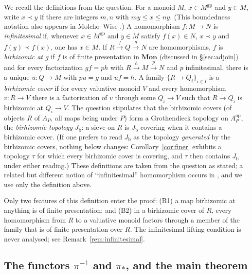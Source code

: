\documentclass[11pt]{article}
\newcommand{\gp}{\mathrm{gp}}
\newcommand{\Jb}{J_{\mathrm b}}
\theoremstyle{definition}
\theoremstyle{remark}
\begin{document}
We recall the definitions from the question.  For a monoid \(M\),
\(x\in M^{\gp}\) and \(y\in M\), write \(x\prec y\) if there are integers
\(m,n\) with \(my\le x\le ny\).  (This boundedness notation also appears in
Molcho--Wise \cite[Def.~2.1.3.1]{MW}.)  A homomorphism \(f:M\to N\) is
\emph{infinitesimal} if, whenever \(x\in M^{\gp}\) and \(y\in M\) satisfy
\(f(x)\in N\), \(x\prec y\) and \(f(y)\prec f(x)\), one has \(x\in M\).
If \(R\xrightarrow{f}Q\xrightarrow{g}N\) are homomorphisms, \(f\) is
\emph{birhizomic at \(g\)} if \(f\) is of finite presentation in
\(\mathbf{Mon}\) (discussed in \S\ref{sec:adjoin}) and for every factorization \(gf=ph\) with
\(R\xrightarrow{h}M\xrightarrow{p}N\) and \(p\) infinitesimal, there is a
unique \(u:Q\to M\) with \(pu=g\) and \(uf=h\).  A family
\(\{R\to Q_i\}_{i\in I}\) is a \emph{birhizomic cover} if for every valuative
monoid \(V\) and every homomorphism \(v:R\to V\) there is a factorization of
\(v\) through some \(Q_i\to V\) such that \(R\to Q_i\) is birhizomic at
\(Q_i\to V\).  The question stipulates that the birhizomic covers (of objects
\(R\) of \(A_P\), all maps being under \(P\)) form a Grothendieck topology on
\(A_P^{\mathrm{op}}\), the \emph{birhizomic topology} \(\Jb\): a sieve on
\(R\) is \(\Jb\)-covering when it contains a birhizomic cover.  (If one
prefers to read \(\Jb\) as the topology \emph{generated} by the birhizomic
covers, nothing below changes: Corollary~\ref{cor:finer} exhibits a
topology \(\tau\) for which every birhizomic cover is covering, and
\(\tau\) then contains \(\Jb\) under either reading.)  These definitions
are taken from the question as stated; a related but different notion of
``infinitesimal'' homomorphism occurs in \cite[Def.~2.1.2.9]{MW}, and we use
only the definition above.

Only two features of this definition enter the proof:
(B1) a map birhizomic at anything is of finite presentation; and
(B2) in a birhizomic cover of \(R\), every homomorphism from \(R\) to
a valuative monoid factors through a member of the family that is of finite
presentation over \(R\).
The infinitesimal lifting condition is never analysed; see
Remark~\ref{rem:infinitesimal}.


\subsection{The functors \texorpdfstring{\(\pi^{-1}\)}{pi\^{}-1} and
  \texorpdfstring{\(\pi_*\)}{pi\_*}, and the main theorem}
\label{sec:functors}
\end{document}
